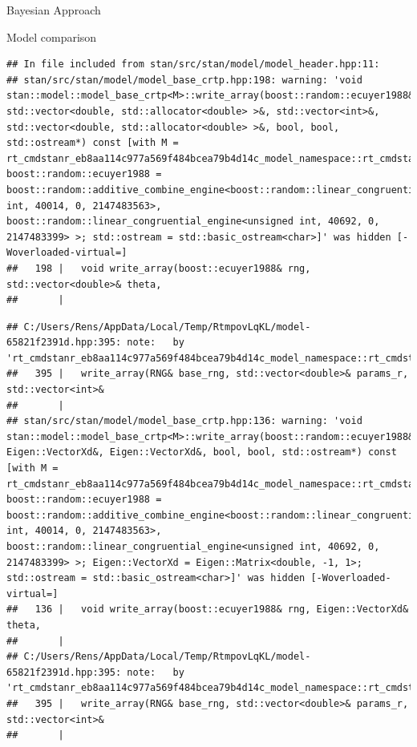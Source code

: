 \documentclass[
  ignorenonframetext,
]{beamer}
\begin{document}
\begin{frame}[fragile]{Bayesian Approach}
\begin{block}{Model comparison}
\begin{verbatim}
## In file included from stan/src/stan/model/model_header.hpp:11:
## stan/src/stan/model/model_base_crtp.hpp:198: warning: 'void stan::model::model_base_crtp<M>::write_array(boost::random::ecuyer1988&, std::vector<double, std::allocator<double> >&, std::vector<int>&, std::vector<double, std::allocator<double> >&, bool, bool, std::ostream*) const [with M = rt_cmdstanr_eb8aa114c977a569f484bcea79b4d14c_model_namespace::rt_cmdstanr_eb8aa114c977a569f484bcea79b4d14c_model; boost::random::ecuyer1988 = boost::random::additive_combine_engine<boost::random::linear_congruential_engine<unsigned int, 40014, 0, 2147483563>, boost::random::linear_congruential_engine<unsigned int, 40692, 0, 2147483399> >; std::ostream = std::basic_ostream<char>]' was hidden [-Woverloaded-virtual=]
##   198 |   void write_array(boost::ecuyer1988& rng, std::vector<double>& theta,
##       |
\end{verbatim}

\begin{verbatim}
## C:/Users/Rens/AppData/Local/Temp/RtmpovLqKL/model-65821f2391d.hpp:395: note:   by 'rt_cmdstanr_eb8aa114c977a569f484bcea79b4d14c_model_namespace::rt_cmdstanr_eb8aa114c977a569f484bcea79b4d14c_model::write_array'
##   395 |   write_array(RNG& base_rng, std::vector<double>& params_r, std::vector<int>&
##       | 
## stan/src/stan/model/model_base_crtp.hpp:136: warning: 'void stan::model::model_base_crtp<M>::write_array(boost::random::ecuyer1988&, Eigen::VectorXd&, Eigen::VectorXd&, bool, bool, std::ostream*) const [with M = rt_cmdstanr_eb8aa114c977a569f484bcea79b4d14c_model_namespace::rt_cmdstanr_eb8aa114c977a569f484bcea79b4d14c_model; boost::random::ecuyer1988 = boost::random::additive_combine_engine<boost::random::linear_congruential_engine<unsigned int, 40014, 0, 2147483563>, boost::random::linear_congruential_engine<unsigned int, 40692, 0, 2147483399> >; Eigen::VectorXd = Eigen::Matrix<double, -1, 1>; std::ostream = std::basic_ostream<char>]' was hidden [-Woverloaded-virtual=]
##   136 |   void write_array(boost::ecuyer1988& rng, Eigen::VectorXd& theta,
##       | 
## C:/Users/Rens/AppData/Local/Temp/RtmpovLqKL/model-65821f2391d.hpp:395: note:   by 'rt_cmdstanr_eb8aa114c977a569f484bcea79b4d14c_model_namespace::rt_cmdstanr_eb8aa114c977a569f484bcea79b4d14c_model::write_array'
##   395 |   write_array(RNG& base_rng, std::vector<double>& params_r, std::vector<int>&
##       |
\end{verbatim}


\end{block}
\end{frame}
\end{document}
